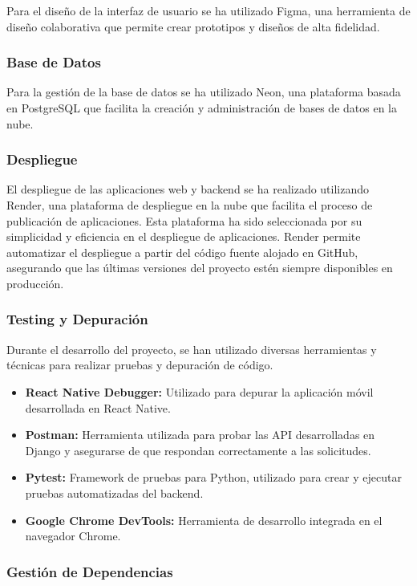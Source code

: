 Para el diseño de la interfaz de usuario se ha utilizado Figma, una herramienta de diseño colaborativa que permite crear prototipos y diseños de alta fidelidad.

\subsubsection{Base de Datos}

Para la gestión de la base de datos se ha utilizado Neon, una plataforma basada en PostgreSQL que facilita la creación y administración de bases de datos en la nube.

\subsubsection{Despliegue}

El despliegue de las aplicaciones web y backend se ha realizado utilizando Render, una plataforma de despliegue en la nube que facilita el proceso de publicación de aplicaciones.
Esta plataforma ha sido seleccionada por su simplicidad y eficiencia en el despliegue de aplicaciones. Render permite automatizar el despliegue a partir del código fuente alojado en GitHub, asegurando que las últimas versiones del proyecto estén siempre disponibles en producción.


\subsubsection{Testing y Depuración}

Durante el desarrollo del proyecto, se han utilizado diversas herramientas y técnicas para realizar pruebas y depuración de código.

\begin{itemize}
    \item \textbf{React Native Debugger:} Utilizado para depurar la aplicación móvil desarrollada en React Native.
    \item \textbf{Postman:} Herramienta utilizada para probar las API desarrolladas en Django y asegurarse de que respondan correctamente a las solicitudes.
    \item \textbf{Pytest:} Framework de pruebas para Python, utilizado para crear y ejecutar pruebas automatizadas del backend.
    \item \textbf{Google Chrome DevTools:} Herramienta de desarrollo integrada en el navegador Chrome.
\end{itemize}

\subsubsection{Gestión de Dependencias}

